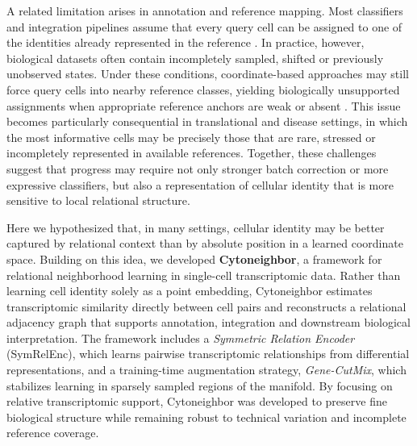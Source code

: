 \documentclass[11pt]{article}
\begin{document}
A related limitation arises in annotation and reference mapping. Most classifiers and integration pipelines assume that every query cell can be assigned to one of the identities already represented in the reference \cite{Abdelaal2019ComparisonAnnotation,Pasquini2021AnnotationReview}. In practice, however, biological datasets often contain incompletely sampled, shifted or previously unobserved states. Under these conditions, coordinate-based approaches may still force query cells into nearby reference classes, yielding biologically unsupported assignments when appropriate reference anchors are weak or absent \cite{Abdelaal2019ComparisonAnnotation,Pasquini2021AnnotationReview,Luecken2022BenchmarkingIntegration}. This issue becomes particularly consequential in translational and disease settings, in which the most informative cells may be precisely those that are rare, stressed or incompletely represented in available references. Together, these challenges suggest that progress may require not only stronger batch correction or more expressive classifiers, but also a representation of cellular identity that is more sensitive to local relational structure.

Here we hypothesized that, in many settings, cellular identity may be better captured by relational context than by absolute position in a learned coordinate space. Building on this idea, we developed \textbf{Cytoneighbor}, a framework for relational neighborhood learning in single-cell transcriptomic data. Rather than learning cell identity solely as a point embedding, Cytoneighbor estimates transcriptomic similarity directly between cell pairs and reconstructs a relational adjacency graph that supports annotation, integration and downstream biological interpretation. The framework includes a \emph{Symmetric Relation Encoder} (SymRelEnc), which learns pairwise transcriptomic relationships from differential representations, and a training-time augmentation strategy, \emph{Gene-CutMix}, which stabilizes learning in sparsely sampled regions of the manifold. By focusing on relative transcriptomic support, Cytoneighbor was developed to preserve fine biological structure while remaining robust to technical variation and incomplete reference coverage.
\end{document}
